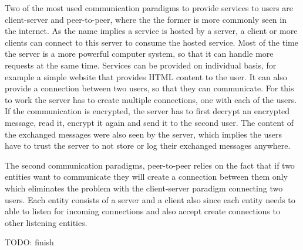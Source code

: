 Two of the most used communication paradigms to provide services to users are client-server and peer-to-peer, where the the former is more commonly seen in the internet. As the name implies a service is hosted by a server, a client or more clients can connect to this server to consume the hosted service. Most of the time the server is a more powerful computer system, so that it can handle more requests at the same time. Services can be provided on individual basis, for example a simple website that provides HTML content to the user. It can also provide a connection between two users, so that they can communicate. For this to work the server has to create multiple connections, one with each of the users. If the communication is encrypted, the server has to first decrypt an encrypted message, read it, encrypt it again and send it to the second user. The content of the exchanged messages were also seen by the server, which implies the users have to trust the server to not store or log their exchanged messages anywhere.

The second communication paradigms, peer-to-peer relies on the fact that if two entities want to communicate they will create a connection between them only which eliminates the problem with the client-server paradigm connecting two users. Each entity consists of a server and a client also since each entity needs to able to listen for incoming connections and also accept create connections to other listening entities. 

TODO: finish
